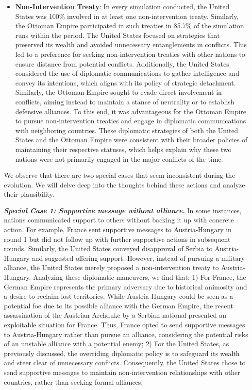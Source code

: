 \documentclass{article}
\begin{document}
\begin{itemize}
    \item \textbf{Non-Intervention Treaty}: In every simulation conducted, the United States was 100\% involved in at least one non-intervention treaty. Similarly, the Ottoman Empire participated in such treaties in 85.7\% of the simulation runs within the period. The United States focused on strategies that preserved its wealth and avoided unnecessary entanglements in conflicts. This led to a preference for seeking non-intervention treaties with other nations to ensure distance from potential conflicts. Additionally, the United States considered the use of diplomatic communications to gather intelligence and convey its intentions, which aligns with its policy of strategic detachment. Similarly, the Ottoman Empire sought to evade direct involvement in conflicts, aiming instead to maintain a stance of neutrality or to establish defensive alliances. To this end, it was advantageous for the Ottoman Empire to pursue non-intervention treaties and engage in diplomatic communications with neighboring countries. These diplomatic strategies of both the United States and the Ottoman Empire were consistent with their broader policies of maintaining their respective statuses, which helps explain why these two nations were not primarily engaged in the major conflicts of the time.
\end{itemize}

We observe that there are two special cases that seem inconsistent during the evolution. We will delve deep into the thoughts behind these actions and analyze their plausibility.

\textbf{\textit{Special Case 1: Supportive message without alliance.}}
In some instances, nations communicated support to others without backing it up with concrete action. For example, France sent supportive messages to Austria-Hungary in round 1 but did not follow up with further supportive actions in subsequent rounds. Similarly, the United States conveyed disapproval of Serbia to Austria-Hungary and suggested offering support. However, instead of pursuing a military alliance, the United States merely proposed a non-intervention treaty to Austria-Hungary.
Analyzing these diplomatic maneuvers, we find that: 1) For France, the German Empire represents the primary adversary due to historical animosity and a desire to reclaim lost territories. While Austria-Hungary could be seen as a potential foe due to its possible alliance with the German Empire, the recent assassination of the Austrian Archduke by a Serbian national presented an exploitable situation for France. Thus, France opted to send supportive messages to Austria-Hungary rather than pursue an alliance, considering the potential risks of an unstable alliance with a potential enemy; 2) For the United States, as previously discussed, the overriding diplomatic policy is to safeguard its wealth and steer clear of unnecessary conflicts. Consequently, the United States chose to send supportive messages to maintain non-intervention relationships with other countries, rather than seeking formal alliances.
\end{document}
